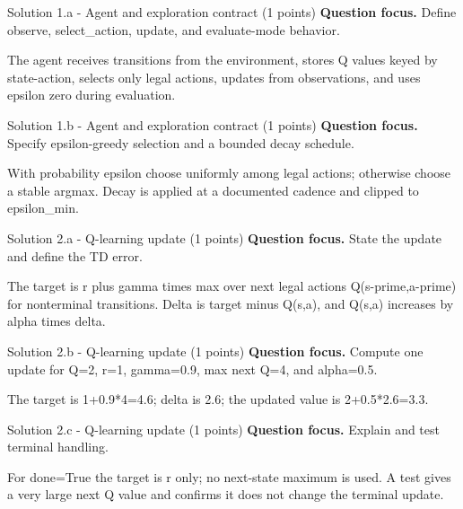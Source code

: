\documentclass[aspectratio=169,11pt]{beamer}
\begin{document}
\begin{frame}{Solution 1.a - Agent and exploration contract (1 points)}
\small
\textbf{Question focus.} Define observe, select\_action, update, and evaluate-mode behavior.

\vspace{0.25cm}
\answerlabel The agent receives transitions from the environment, stores Q values keyed by state-action, selects only legal actions, updates from observations, and uses epsilon zero during evaluation.
\end{frame}

\begin{frame}{Solution 1.b - Agent and exploration contract (1 points)}
\small
\textbf{Question focus.} Specify epsilon-greedy selection and a bounded decay schedule.

\vspace{0.25cm}
\answerlabel With probability epsilon choose uniformly among legal actions; otherwise choose a stable argmax. Decay is applied at a documented cadence and clipped to epsilon\_min.
\end{frame}

\begin{frame}{Solution 2.a - Q-learning update (1 points)}
\small
\textbf{Question focus.} State the update and define the TD error.

\vspace{0.25cm}
\answerlabel The target is r plus gamma times max over next legal actions Q(s-prime,a-prime) for nonterminal transitions. Delta is target minus Q(s,a), and Q(s,a) increases by alpha times delta.
\end{frame}

\begin{frame}{Solution 2.b - Q-learning update (1 points)}
\small
\textbf{Question focus.} Compute one update for Q=2, r=1, gamma=0.9, max next Q=4, and alpha=0.5.

\vspace{0.25cm}
\answerlabel The target is 1+0.9*4=4.6; delta is 2.6; the updated value is 2+0.5*2.6=3.3.
\end{frame}

\begin{frame}{Solution 2.c - Q-learning update (1 points)}
\small
\textbf{Question focus.} Explain and test terminal handling.

\vspace{0.25cm}
\answerlabel For done=True the target is r only; no next-state maximum is used. A test gives a very large next Q value and confirms it does not change the terminal update.
\end{frame}
\end{document}
